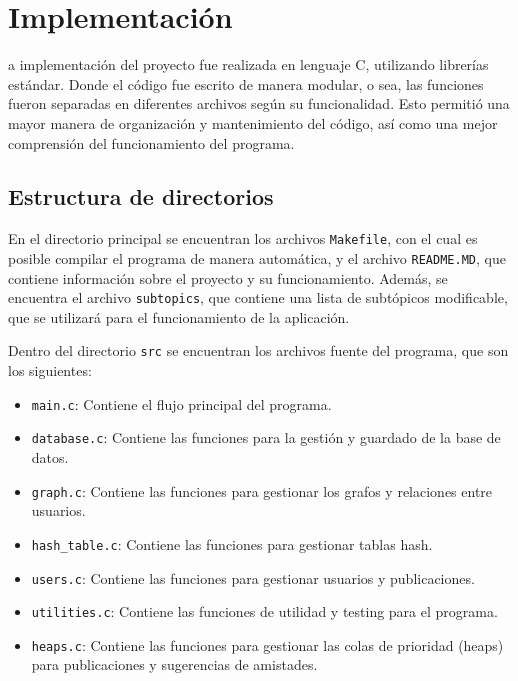 \documentclass[9pt,letterpaper,onecolumn]{rho-class/rho}
\begin{document}
\newpage
\section{Implementación}

    a implementación del proyecto fue realizada en lenguaje C, utilizando librerías estándar. Donde el código fue escrito de manera modular, o sea, las funciones fueron separadas en diferentes archivos según su funcionalidad. Esto permitió una mayor manera de organización y mantenimiento del código, así como una mejor comprensión del funcionamiento del programa.

    \subsection{Estructura de directorios}
    En el directorio principal se encuentran los archivos \texttt{Makefile}, con el cual es posible compilar el programa de manera automática, y el archivo \texttt{README.MD}, que contiene información sobre el proyecto y su funcionamiento. Además, se encuentra el archivo \texttt{subtopics}, que contiene una lista de subtópicos modificable, que se utilizará para el funcionamiento de la aplicación.

    \vspace{0.5cm}

    Dentro del directorio \texttt{src} se encuentran los archivos fuente del programa, que son los siguientes:
    \begin{itemize}
        \item \texttt{main.c}: Contiene el flujo principal del programa.
        \item \texttt{database.c}: Contiene las funciones para la gestión y guardado de la base de datos.
        \item \texttt{graph.c}: Contiene las funciones para gestionar los grafos y relaciones entre usuarios.
        \item \texttt{hash\_table.c}: Contiene las funciones para gestionar tablas hash.
        \item \texttt{users.c}: Contiene las funciones para gestionar usuarios y publicaciones.
        \item \texttt{utilities.c}: Contiene las funciones de utilidad y testing para el programa.
        \item \texttt{heaps.c}: Contiene las funciones para gestionar las colas de prioridad (heaps) para publicaciones y sugerencias de amistades.
    \end{itemize}
\end{document}
